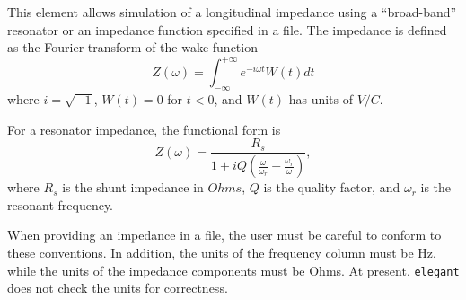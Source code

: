 This element allows simulation of a longitudinal impedance using a
``broad-band'' resonator or an impedance function specified in a file.
The impedance is defined as the Fourier transform of the wake function
\begin{equation}
Z(\omega) = \int_{-\infty}^{+\infty} e^{-i \omega t} W(t) dt
\end{equation}
where $i = \sqrt{-1}$, $W(t)=0$ for $t<0$, and $W(t)$ has units of $V/C$.

For a resonator impedance, the functional form is
\begin{equation}
Z(\omega) = \frac{R_s}{1 + iQ(\frac{\omega}{\omega_r} - \frac{\omega_r}{\omega})},
\end{equation}
where $R_s$ is the shunt impedance in $Ohms$, $Q$ is the quality
factor, and $\omega_r$ is the resonant frequency.

When providing an impedance in a file, the user must be careful to conform to these
conventions. In addition, the units of the frequency column must be Hz, while the units
of the impedance components must be Ohms.
At present, {\tt elegant} does not check the units for correctness.

